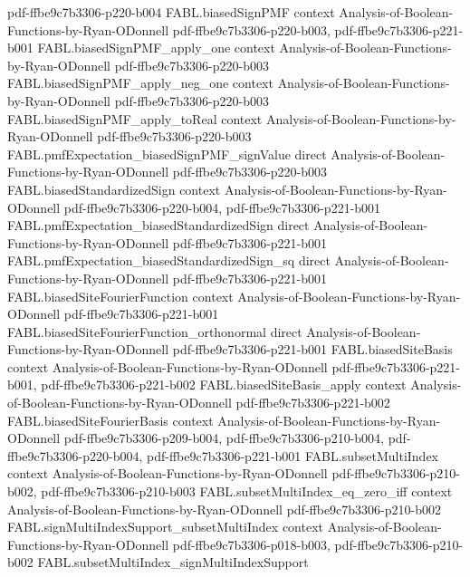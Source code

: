 \begin{theorem}
  {pdf-ffbe9c7b3306-p220-b004}
\proofstep
  {FABL.biasedSignPMF}
  {context}
  {Analysis-of-Boolean-Functions-by-Ryan-ODonnell}
  {pdf-ffbe9c7b3306-p220-b003,
    pdf-ffbe9c7b3306-p221-b001}
\proofstep
  {FABL.biasedSignPMF_apply_one}
  {context}
  {Analysis-of-Boolean-Functions-by-Ryan-ODonnell}
  {pdf-ffbe9c7b3306-p220-b003}
\proofstep
  {FABL.biasedSignPMF_apply_neg_one}
  {context}
  {Analysis-of-Boolean-Functions-by-Ryan-ODonnell}
  {pdf-ffbe9c7b3306-p220-b003}
\proofstep
  {FABL.biasedSignPMF_apply_toReal}
  {context}
  {Analysis-of-Boolean-Functions-by-Ryan-ODonnell}
  {pdf-ffbe9c7b3306-p220-b003}
\proofstep
  {FABL.pmfExpectation_biasedSignPMF_signValue}
  {direct}
  {Analysis-of-Boolean-Functions-by-Ryan-ODonnell}
  {pdf-ffbe9c7b3306-p220-b003}
\proofstep
  {FABL.biasedStandardizedSign}
  {context}
  {Analysis-of-Boolean-Functions-by-Ryan-ODonnell}
  {pdf-ffbe9c7b3306-p220-b004,
    pdf-ffbe9c7b3306-p221-b001}
\proofstep
  {FABL.pmfExpectation_biasedStandardizedSign}
  {direct}
  {Analysis-of-Boolean-Functions-by-Ryan-ODonnell}
  {pdf-ffbe9c7b3306-p221-b001}
\proofstep
  {FABL.pmfExpectation_biasedStandardizedSign_sq}
  {direct}
  {Analysis-of-Boolean-Functions-by-Ryan-ODonnell}
  {pdf-ffbe9c7b3306-p221-b001}
\proofstep
  {FABL.biasedSiteFourierFunction}
  {context}
  {Analysis-of-Boolean-Functions-by-Ryan-ODonnell}
  {pdf-ffbe9c7b3306-p221-b001}
\proofstep
  {FABL.biasedSiteFourierFunction_orthonormal}
  {direct}
  {Analysis-of-Boolean-Functions-by-Ryan-ODonnell}
  {pdf-ffbe9c7b3306-p221-b001}
\proofstep
  {FABL.biasedSiteBasis}
  {context}
  {Analysis-of-Boolean-Functions-by-Ryan-ODonnell}
  {pdf-ffbe9c7b3306-p221-b001,
    pdf-ffbe9c7b3306-p221-b002}
\proofstep
  {FABL.biasedSiteBasis_apply}
  {context}
  {Analysis-of-Boolean-Functions-by-Ryan-ODonnell}
  {pdf-ffbe9c7b3306-p221-b002}
\proofstep
  {FABL.biasedSiteFourierBasis}
  {context}
  {Analysis-of-Boolean-Functions-by-Ryan-ODonnell}
  {pdf-ffbe9c7b3306-p209-b004,
    pdf-ffbe9c7b3306-p210-b004,
    pdf-ffbe9c7b3306-p220-b004,
    pdf-ffbe9c7b3306-p221-b001}
\proofstep
  {FABL.subsetMultiIndex}
  {context}
  {Analysis-of-Boolean-Functions-by-Ryan-ODonnell}
  {pdf-ffbe9c7b3306-p210-b002,
    pdf-ffbe9c7b3306-p210-b003}
\proofstep
  {FABL.subsetMultiIndex_eq_zero_iff}
  {context}
  {Analysis-of-Boolean-Functions-by-Ryan-ODonnell}
  {pdf-ffbe9c7b3306-p210-b002}
\proofstep
  {FABL.signMultiIndexSupport_subsetMultiIndex}
  {context}
  {Analysis-of-Boolean-Functions-by-Ryan-ODonnell}
  {pdf-ffbe9c7b3306-p018-b003,
    pdf-ffbe9c7b3306-p210-b002}
\proofstep
  {FABL.subsetMultiIndex_signMultiIndexSupport}

\end{theorem}
